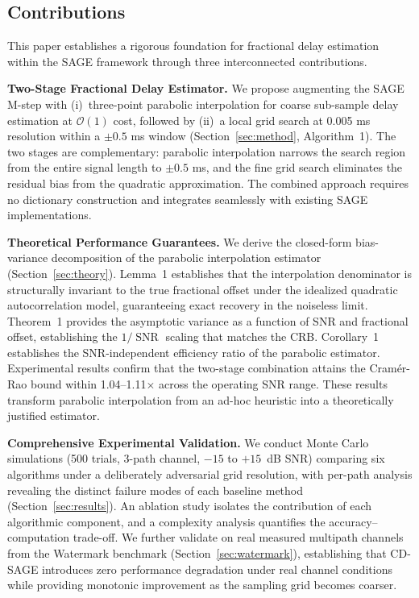 \documentclass[a4paper,fleqn]{cas-dc}
\DeclareMathOperator{\SNR}{SNR}
\newcommand{\bigO}{\mathcal{O}}
\begin{document}
\subsection{Contributions}

This paper establishes a rigorous foundation for fractional delay estimation within the SAGE framework through three interconnected contributions.

\noindent\textbf{Two-Stage Fractional Delay Estimator.} We propose augmenting the SAGE M-step with (i)~three-point parabolic interpolation for coarse sub-sample delay estimation at $\bigO(1)$ cost, followed by (ii)~a local grid search at 0.005 ms resolution within a $\pm 0.5$ ms window (Section~\ref{sec:method}, Algorithm~1). The two stages are complementary: parabolic interpolation narrows the search region from the entire signal length to $\pm 0.5$ ms, and the fine grid search eliminates the residual bias from the quadratic approximation. The combined approach requires no dictionary construction and integrates seamlessly with existing SAGE implementations.

\noindent\textbf{Theoretical Performance Guarantees.} We derive the closed-form bias-variance decomposition of the parabolic interpolation estimator (Section~\ref{sec:theory}). Lemma~1 establishes that the interpolation denominator is structurally invariant to the true fractional offset under the idealized quadratic autocorrelation model, guaranteeing exact recovery in the noiseless limit. Theorem~1 provides the asymptotic variance as a function of SNR and fractional offset, establishing the $1/\SNR$ scaling that matches the CRB. Corollary~1 establishes the SNR-independent efficiency ratio of the parabolic estimator. Experimental results confirm that the two-stage combination attains the Cram\'{e}r-Rao bound within 1.04--1.11$\times$ across the operating SNR range. These results transform parabolic interpolation from an ad-hoc heuristic into a theoretically justified estimator.

\noindent\textbf{Comprehensive Experimental Validation.} We conduct Monte Carlo simulations (500 trials, 3-path channel, $-15$ to $+15$~dB SNR) comparing six algorithms under a deliberately adversarial grid resolution, with per-path analysis revealing the distinct failure modes of each baseline method (Section~\ref{sec:results}). An ablation study isolates the contribution of each algorithmic component, and a complexity analysis quantifies the accuracy--computation trade-off. We further validate on real measured multipath channels from the Watermark benchmark (Section~\ref{sec:watermark}), establishing that CD-SAGE introduces zero performance degradation under real channel conditions while providing monotonic improvement as the sampling grid becomes coarser.
\end{document}
